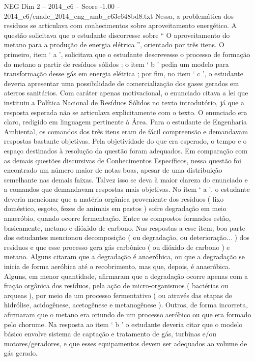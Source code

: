 \begin{textsample}{NEG Dim 2 – 2014\_c6 – Score -1.00 – 2014\_c6/enade\_2014\_eng\_amb\_c63c648bd8.txt}
Nessa, a problemática dos resíduos se articulava com conhecimentos sobre aproveitamento energético.
A questão solicitava que o estudante discorresse sobre “ O aproveitamento do metano para a produção de energia elétrica ”, orientado por três itens.
O primeiro, item ‘ a ’, solicitava que o estudante descrevesse o processo de formação do metano a partir de resíduos sólidos ; o item ‘ b ’ pedia um modelo para transformação desse gás em energia elétrica ; por fim, no item ‘ c ’, o estudante deveria apresentar uma possibilidade de comercialização dos gases gerados em aterros sanitários.
Com caráter apenas motivacional, o enunciado citava a lei que instituiu a Política Nacional de Resíduos Sólidos no texto introdutório, já que a resposta esperada não se articulava explicitamente com o texto.
O enunciado era claro, redigido em linguagem pertinente à Área.
Para o estudante de Engenharia Ambiental, os comandos dos três itens eram de fácil compreensão e demandavam respostas bastante objetivas.
Pela objetividade do que era esperado, o tempo e o espaço destinados à resolução da questão foram adequados.
Em comparação com as demais questões discursivas de Conhecimentos Específicos, nessa questão foi encontrado um número maior de notas boas, apesar de uma distribuição semelhante nas demais faixas.
Talvez isso se deva à maior clareza do enunciado e a comandos que demandavam respostas mais objetivas.
No item ‘ a ’, o estudante deveria mencionar que a matéria orgânica proveniente dos resíduos ( lixo doméstico, esgoto, fezes de animais em pastos ) sofre degradação em meio anaeróbio, quando ocorre fermentação.
Entre os compostos formados estão, basicamente, metano e dióxido de carbono.
Nas respostas a esse item, boa parte dos estudantes mencionou decomposição ( ou degradação, ou deterioração... ) dos resíduos e que esse processo gera gás carbônico ( ou dióxido de carbono ) e metano.
Alguns citaram que a degradação é anaeróbica, ou que a degradação se inicia de forma aeróbica até o recobrimento, mas que, depois, é anaeróbica.
Alguns, em menor quantidade, afirmaram que a degradação ocorre apenas com a fração orgânica dos resíduos, pela ação de micro-organismos ( bactérias ou arqueas ), por meio de um processo fermentativo ( ou através das etapas de hidrólise, acidogênese, acetogênese e metanogênese ).
Outros, de forma incorreta, afirmaram que o metano era oriundo de um processo aeróbico ou que era formado pelo chorume.
Na resposta ao item ‘ b ’ o estudante deveria citar que o modelo básico envolve sistema de captação e tratamento de gás, turbinas e/ou motores/geradores, e que esses equipamentos devem ser adequados ao volume de gás gerado.

\end{textsample}
